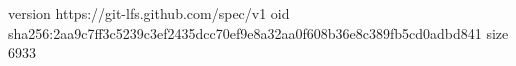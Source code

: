 version https://git-lfs.github.com/spec/v1
oid sha256:2aa9c7ff3c5239c3ef2435dcc70ef9e8a32aa0f608b36e8c389fb5cd0adbd841
size 6933
